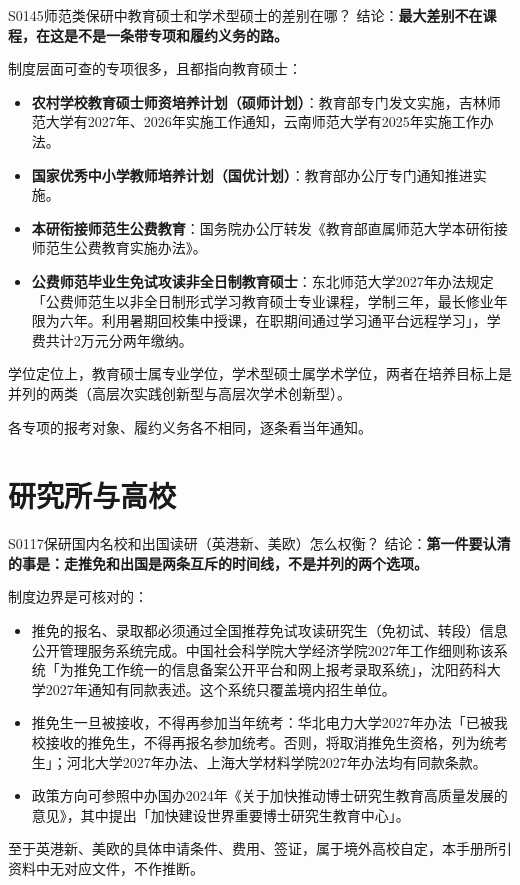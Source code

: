 \begin{qa}{S0145}{师范类保研中教育硕士和学术型硕士的差别在哪？}
结论：\textbf{最大差别不在课程，在这是不是一条带专项和履约义务的路。}

制度层面可查的专项很多，且都指向教育硕士：
\begin{itemize}
  \item \textbf{农村学校教育硕士师资培养计划（硕师计划）}：教育部专门发文实施，吉林师范大学有2027年、2026年实施工作通知，云南师范大学有2025年实施工作办法。
  \item \textbf{国家优秀中小学教师培养计划（国优计划）}：教育部办公厅专门通知推进实施。
  \item \textbf{本研衔接师范生公费教育}：国务院办公厅转发《教育部直属师范大学本研衔接师范生公费教育实施办法》。
  \item \textbf{公费师范毕业生免试攻读非全日制教育硕士}：东北师范大学2027年办法规定「公费师范生以非全日制形式学习教育硕士专业课程，学制三年，最长修业年限为六年。利用暑期回校集中授课，在职期间通过学习通平台远程学习」，学费共计2万元分两年缴纳。
\end{itemize}

学位定位上，教育硕士属专业学位，学术型硕士属学术学位，两者在培养目标上是并列的两类（高层次实践创新型与高层次学术创新型）。

各专项的报考对象、履约义务各不相同，逐条看当年通知。
\end{qa}

\section{研究所与高校}
\begin{qa}{S0117}{保研国内名校和出国读研（英港新、美欧）怎么权衡？}
结论：\textbf{第一件要认清的事是：走推免和出国是两条互斥的时间线，不是并列的两个选项。}

制度边界是可核对的：
\begin{itemize}
  \item 推免的报名、录取都必须通过全国推荐免试攻读研究生（免初试、转段）信息公开管理服务系统完成。中国社会科学院大学经济学院2027年工作细则称该系统「为推免工作统一的信息备案公开平台和网上报考录取系统」，沈阳药科大学2027年通知有同款表述。这个系统只覆盖境内招生单位。
  \item 推免生一旦被接收，不得再参加当年统考：华北电力大学2027年办法「已被我校接收的推免生，不得再报名参加统考。否则，将取消推免生资格，列为统考生」；河北大学2027年办法、上海大学材料学院2027年办法均有同款条款。
  \item 政策方向可参照中办国办2024年《关于加快推动博士研究生教育高质量发展的意见》，其中提出「加快建设世界重要博士研究生教育中心」。
\end{itemize}

至于英港新、美欧的具体申请条件、费用、签证，属于境外高校自定，本手册所引资料中无对应文件，不作推断。
\end{qa}

